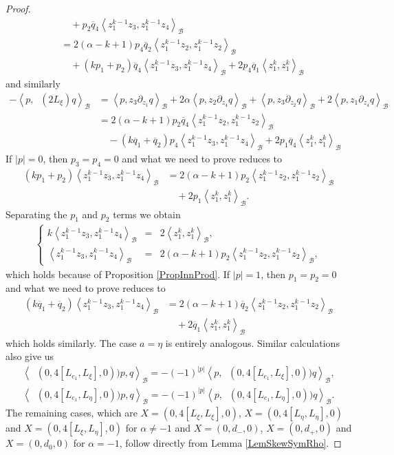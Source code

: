 \documentclass{amsart}
\numberwithin{theorem}{section}
\theoremstyle{definition}
\theoremstyle{remark}
\newcommand{\bfip}[1]{\left<{#1}\right>_\mathcal B}
\newcommand{\pt}[1]{\partial_{#1}}
\newcommand{\ol}[1]{\overline{#1}}
\DeclareMathOperator{\pil}{\pi_\lambda}
\DeclareMathOperator{\rol}{\rho_\lambda}
\begin{document}
\begin{proof}
\begin{align*}
&\quad + p_2 \ol q_4\bfip{z_1^{k-1}{z_3}, z_1^{k-1}{z_4}}\\
&=  2(\alpha-k+1)p_4\ol q_2 \bfip{z_1^{k-1}{z_2}, z_1^{k-1}{z_2}}\\
&\quad +(k p_1 +p_2)\ol q_4 \bfip{z_1^{k-1}{z_3}, z_1^{k-1}{z_4}} +2p_4\ol q_1 \bfip{z_1^{k}, z_1^{k}}
\end{align*}
and similarly
\begin{align*}
-\bfip{p,\pil(2L_{\xi})q} &= \bfip{ p, {z_3}\pt {z_1}q} +2\alpha\bfip{ p,{z_2}\pt{z_4} q} + \bfip{p,{z_3}\pt {z_2} q}+2\bfip{ p, {z_1}\pt{z_4} q}\\
&=  2(\alpha-k+1)p_2\ol q_4 \bfip{z_1^{k-1}{z_2}, z_1^{k-1}{z_2}}\\
&\quad -(k\ol q_1  +\ol q_2)p_4 \bfip{z_1^{k-1}{z_3}, z_1^{k-1}{z_4}} +2p_1\ol q_4 \bfip{z_1^{k}, z_1^{k}}
\end{align*}
If $|p|=0$, then $p_3 = p_4 = 0$ and what we need to prove reduces to
\begin{align*}
(k p_1 +p_2) \bfip{z_1^{k-1}{z_3}, z_1^{k-1}{z_4}} &=  2(\alpha-k+1)p_2 \bfip{z_1^{k-1}{z_2}, z_1^{k-1}{z_2}} \\
&\quad +2p_1\bfip{z_1^{k}, z_1^{k}}.
\end{align*}
Separating the $p_1$ and $p_2$ terms we obtain
\begin{align*}
\left\lbrace\begin{array}{lcl}
k \bfip{z_1^{k-1}{z_3}, z_1^{k-1}{z_4}} &=&  2\bfip{z_1^{k}, z_1^{k}},\\
\bfip{z_1^{k-1}{z_3}, z_1^{k-1}{z_4}} &=&  2(\alpha-k+1)p_2 \bfip{z_1^{k-1}{z_2}, z_1^{k-1}{z_2}},
\end{array}\right.
\end{align*}
which holds because of Proposition \ref{PropInnProd}.
If $|p|=1$, then $p_1 = p_2 = 0$ and what we need to prove reduces to
\begin{align*}
(k\ol q_1  +\ol q_2) \bfip{z_1^{k-1}{z_3}, z_1^{k-1}{z_4}} &= 2(\alpha-k+1)\ol q_2 \bfip{z_1^{k-1}{z_2}, z_1^{k-1}{z_2}}\\
&\quad +2\ol q_1 \bfip{z_1^{k}, z_1^{k}}
\end{align*}
which holds similarly. The case $a=\eta$ is entirely analogous. Similar calculations also give us
\begin{align*}
\bfip{\rol(0, 4[L_{e_1}, L_\xi], 0))p,q} = - (-1)^{|p|}\bfip{p,\rol(0, 4[L_{e_1}, L_{\xi}], 0))q},\\
\bfip{\rol(0, 4[L_{e_1}, L_{\eta}], 0))p,q} = - (-1)^{|p|}\bfip{p,\rol(0, 4[L_{e_1}, L_{\eta}], 0))q}.
\end{align*}
The remaining cases, which are $X = (0, 4[L_{\xi}, L_\xi], 0)$, $X=(0, 4[L_{\eta}, L_{\eta}], 0)$ and $X=(0, 4[L_{\xi}, L_\eta], 0)$ for $\alpha \neq -1$ and $X = (0, d_-, 0)$, $X=(0, d_+, 0)$ and $X=(0, d_0, 0)$ for $\alpha = -1$, follow directly from Lemma \ref{LemSkewSymRho}.
\qedhere
\end{proof}
\end{document}
